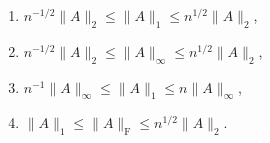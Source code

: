 \begin{Theorem}\label{thm:matrix-norm-comparisons}
\begin{enumerate}[label=(\arabic*)]
\item $n^{-1/2}\|A\|_2\le\|A\|_1\le n^{1/2}\|A\|_2$,
\item $n^{-1/2}\|A\|_2\le\|A\|_\infty\le n^{1/2}\|A\|_2$,
\item $n^{-1}\|A\|_\infty\le\|A\|_1\le n\|A\|_\infty$,
\item $\|A\|_1\le\|A\|_{\mathrm F}\le n^{1/2}\|A\|_2$.
\end{enumerate}
\end{Theorem}
